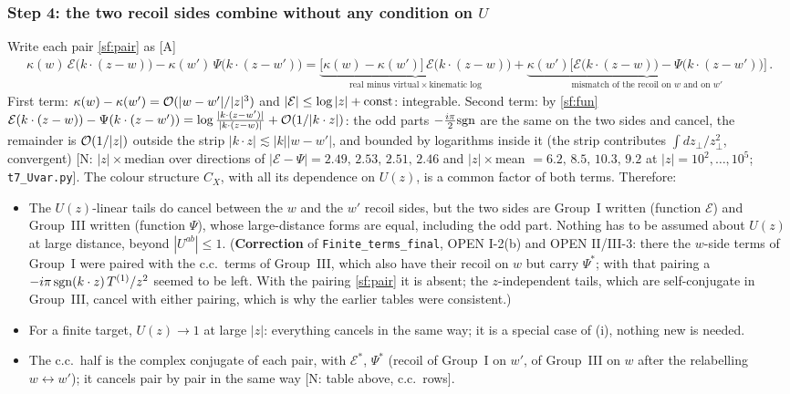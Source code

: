 \documentclass[10pt]{article}
\begin{document}
\subsubsection{Step 4: the two recoil sides combine without any condition on $U$}
\noindent Write each pair \eqref{sf:pair} as [A]
\begin{align}
\kappa(w)\,\mathcal{E}\big(k\cdot(z-w)\big)-\kappa(w')\,\Psi\big(k\cdot(z-w')\big)=\underbrace{\big[\kappa(w)-\kappa(w')\big]\,\mathcal{E}\big(k\cdot(z-w)\big)}_{\text{real minus virtual}\,\times\,\text{kinematic log}}+\underbrace{\kappa(w')\Big[\mathcal{E}\big(k\cdot(z-w)\big)-\Psi\big(k\cdot(z-w')\big)\Big]}_{\text{mismatch of the recoil on $w$ and on $w'$}}\,.\label{sf:rmv}
\end{align}
First term: $\kappa(w)-\kappa(w')={\cal O}(|w-w'|/|z|^{3})$ and $|\mathcal{E}|\le\log|z|+{\rm const}$: integrable. Second term: by \eqref{sf:fun} $\mathcal{E}(k\cdot(z-w))-\Psi(k\cdot(z-w'))=\log\frac{|k\cdot(z-w')|}{|k\cdot(z-w)|}+{\cal O}(1/|k\cdot z|)$: the odd parts $-\frac{i\pi}{2}{\rm sgn}$ are the same on the two sides and cancel, the remainder is ${\cal O}(1/|z|)$ outside the strip $|k\cdot z|\lesssim|k||w-w'|$, and bounded by logarithms inside it (the strip contributes $\int dz_{\perp}/z_{\perp}^{2}$, convergent) [N: $|z|\times$median over directions of $|\mathcal{E}-\Psi|=2.49,\,2.53,\,2.51,\,2.46$ and $|z|\times$mean $=6.2,\,8.5,\,10.3,\,9.2$ at $|z|=10^{2},\dots,10^{5}$; \texttt{t7\_Uvar.py}]. The colour structure $C_{X}$, with all its dependence on $U(z)$, is a common factor of both terms. Therefore:
\begin{itemize}
\item[(i)] The $U(z)$-linear tails do cancel between the $w$ and the $w'$ recoil sides, but the two sides are Group~I written (function $\mathcal{E}$) and Group~III written (function $\Psi$), whose large-distance forms are equal, including the odd part. Nothing has to be assumed about $U(z)$ at large distance, beyond $|U^{ab}|\le1$. (\textbf{Correction} of \texttt{Finite\_terms\_final}, OPEN I-2(b) and OPEN II/III-3: there the $w$-side terms of Group~I were paired with the c.c.\ terms of Group~III, which also have their recoil on $w$ but carry $\Psi^{*}$; with that pairing a $-i\pi\,{\rm sgn}(k\cdot z)\,T^{(1)}/z^{2}$ seemed to be left. With the pairing \eqref{sf:pair} it is absent; the $z$-independent tails, which are self-conjugate in Group~III, cancel with either pairing, which is why the earlier tables were consistent.)
\item[(ii)] For a finite target, $U(z)\to1$ at large $|z|$: everything cancels in the same way; it is a special case of (i), nothing new is needed.
\item[(iii)] The c.c.\ half is the complex conjugate of each pair, with $\mathcal{E}^{*}$, $\Psi^{*}$ (recoil of Group~I on $w'$, of Group~III on $w$ after the relabelling $w\leftrightarrow w'$); it cancels pair by pair in the same way [N: table above, c.c.\ rows].
\end{itemize}
\end{document}
